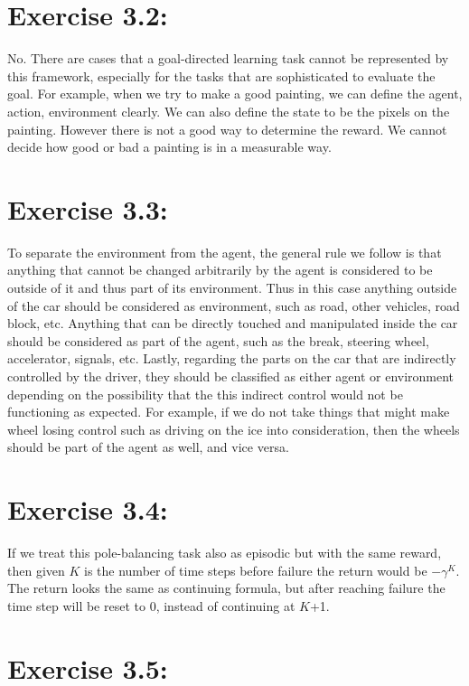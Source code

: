 \documentclass[10pt,letterpaper]{article}
\begin{document}
\section*{Exercise 3.2: }
\label{3.2}

No. There are cases that a goal-directed learning task cannot be represented by this framework, especially for the tasks that are sophisticated to evaluate the goal. For example, when we try to make a good painting, we can define the agent, action, environment clearly. We can also define the state to be the pixels on the painting. However there is not a good way to determine the reward. We cannot decide how good or bad a painting is in a measurable way. 

\section*{Exercise 3.3: }
\label{3.3}

To separate the environment from the agent, the general rule we follow is that anything that cannot be changed arbitrarily by the agent is considered to be outside of it and thus part of its environment. Thus in this case anything outside of the car should be considered as environment, such as road, other vehicles, road block, etc. Anything that can be directly touched and manipulated inside the car should be considered as part of the agent, such as the break, steering wheel, accelerator, signals, etc. Lastly, regarding the parts on the car that are indirectly controlled by the driver, they should be classified as either agent or environment depending on the possibility that the this indirect control would not be functioning as expected. For example, if we do not take things that might make wheel losing control such as driving on the ice into consideration, then the wheels should be part of the agent as well, and vice versa.


\section*{Exercise 3.4: }
\label{3.4}

If we treat this pole-balancing task also as episodic but with the same reward, then given $K$ is the number of time steps before failure the return would be $-\gamma^K$. The return looks the same as continuing formula, but after reaching failure the time step will be reset to 0, instead of continuing at $K$+1.


\section*{Exercise 3.5: }
\label{3.5}
\end{document}
